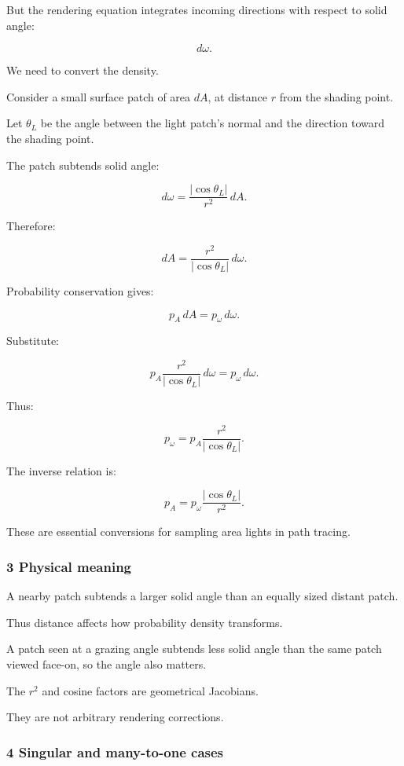 But the rendering equation integrates incoming directions with respect to solid angle:

\[
 d\omega.
\]

We need to convert the density.

Consider a small surface patch of area \(dA\), at distance \(r\) from the shading point.

Let \(\theta_L\) be the angle between the light patch's normal and the direction toward the shading point.

The patch subtends solid angle:

\[
 \boxed{ d\omega= \frac{|\cos\theta_L|}{r^2}\,dA }.
\]

Therefore:

\[
 dA= \frac{r^2}{|\cos\theta_L|}\,d\omega.
\]

Probability conservation gives:

\[
 p_A\,dA=p_\omega\,d\omega.
\]

Substitute:

\[
 p_A\frac{r^2}{|\cos\theta_L|}\,d\omega = p_\omega\,d\omega.
\]

Thus:

\[
 \boxed{ p_\omega= p_A\frac{r^2}{|\cos\theta_L|} }.
\]

The inverse relation is:

\[
 \boxed{ p_A= p_\omega\frac{|\cos\theta_L|}{r^2} }.
\]

These are essential conversions for sampling area lights in path tracing.

\subsubsection{3 Physical meaning}\label{02-foundations-ii-ch029-physical-meaning}

A nearby patch subtends a larger solid angle than an equally sized distant patch.

Thus distance affects how probability density transforms.

A patch seen at a grazing angle subtends less solid angle than the same patch viewed face-on, so the angle also matters.

The \(r^2\) and cosine factors are geometrical Jacobians.

They are not arbitrary rendering corrections.

\subsubsection{4 Singular and many-to-one cases}\label{02-foundations-ii-ch029-singular-and-many-to-one-cases}

